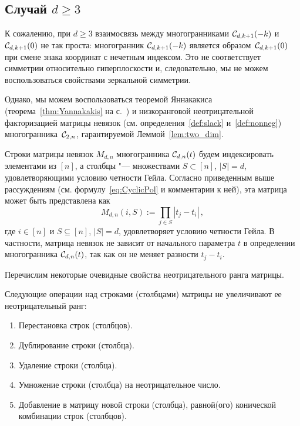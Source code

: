 \subsection{Случай $d \ge 3$}

К сожалению, при $d \ge 3$ взаимосвязь между многогранниками ${\mathcal C}_{d,k+1}(-k)$ и~${\mathcal C}_{d,k+1}(0)$ не так проста: многогранник ${\mathcal C}_{d,k+1}(-k)$ является образом~${\mathcal C}_{d,k+1}(0)$ при смене знака координат с нечетным индексом. Это не соответствует симметрии относительно гиперплоскости и, следовательно, мы не можем воспользоваться свойствами зеркальной симметрии. 

Однако, мы можем воспользоваться теоремой Яннакакиса (теорема~\ref{thm:Yannakakis} на с.~\pageref{thm:Yannakakis})
и низкоранговой неотрицательной факторизацией матрицы невязок (см. определения~\ref{def:slack} и~\ref{def:nonneg}) многогранника~${\mathcal C}_{2,n}$, гарантируемой Леммой~\ref{lem:two_dim}. 

Строки матрицы невязок $M_{d,n}$ многогранника ${\mathcal C}_{d,n}(t)$ будем индексировать элементами из $[n]$, а столбцы "--- множествами $S \subset [n]$, $|S|=d$, удовлетворяющими условию четности Гейла.
Согласно приведенным выше рассуждениям (см. формулу~\eqref{eq:CyclicPol} и комментарии к ней), эта матрица может быть представлена как
%
\begin{equation}
\label{eq:slack}
M_{d,n}(i,S) := \prod_{j \in S} |t_j - t_i|\,,
\end{equation}
%
где $i\in[n]$ и $S\subseteq [n]$, $|S|=d$, удовлетворяет условию четности Гейла.
В частности, матрица невязок не зависит от начального параметра $t$ в определении многогранника ${\mathcal C}_{d,n}(t)$, так как он не меняет разности $t_j - t_i$. 

Перечислим некоторые очевидные свойства неотрицательного ранга матрицы.

\begin{property}\label{prop:nonneg}
Следующие операции над строками (столбцами) матрицы не увеличивают ее неотрицательный ранг:
\begin{enumerate}
	\item Перестановка строк (столбцов).
	\item Дублирование строки (столбца).
	\item Удаление строки (столбца).
	\item Умножение строки (столбца) на неотрицательное число.
	\item Добавление в матрицу новой строки (столбца), равной(ого) конической комбинации строк (столбцов).
\end{enumerate}
\end{property}

